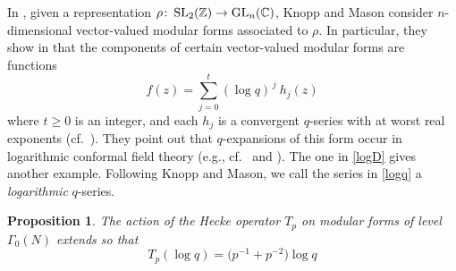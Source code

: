 \documentclass{gtpart}
\newtheorem{prop}[thm]{Proposition}
\theoremstyle{definition}
\theoremstyle{remark}
\def\co{\colon\thinspace}
\newcommand{\mb}[1]{\mathbb{#1}}
\newcommand{\BC}{{\mb C}}
\newcommand{\BZ}{{\mb Z}}
\newcommand{\G}{\Gamma}
\renewcommand{\=}{\approx}
\renewcommand{\-}{\sim}
\newcommand{\GL}{{\rm GL}}
\newcommand{\SL}{{\rm SL}}
\numberwithin{equation}{section}
\numberwithin{thm}{section}
\begin{document}
In \cite{KnoppMason}, given a representation 
$\rho \co \SL_2(\BZ) \to \GL_n(\BC)$, Knopp and Mason consider $n$-dimensional 
vector-valued modular forms associated to $\rho$.  In particular, they show in 
\cite[Theorem 2.2]{KnoppMason} that the components of certain vector-valued 
modular forms are functions 
\begin{equation}
 \label{logq}
 f(z) = \sum_{j = 0}^t (\log q)^{\,j} ~\! h_j(z) 
\end{equation}
where $t \geq 0$ is an integer, and each $h_j$ is a convergent $q$-series with 
at worst real exponents 
(cf.~\cite[(7), (13), and Sections 3.2--3.3]{KnoppMason}).  They point out that 
$q$-expansions of this form occur in logarithmic conformal field theory (e.g., 
cf.~\cite[(5.3.9)]{Zhu} and \cite[(6.12)]{DongLiMason}).  The one in 
\eqref{logD} gives another example.  Following Knopp and Mason, we call the 
series in \eqref{logq} a {\em logarithmic} $q$-series.  

\begin{prop}
 \label{prop:logq}
 The action of the Hecke operator $T_p$ on modular forms of level $\G_0(N)$ 
 extends so that 
 \[
  T_p (\log q) = \big( p^{-1} + p^{-2} \big) \log q 
 \]
\end{prop}
\end{document}
